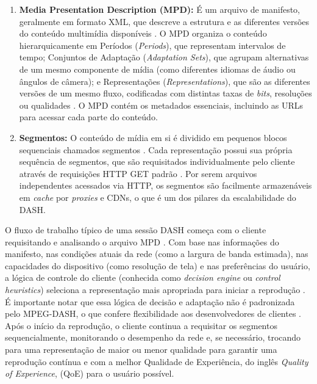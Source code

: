\begin{enumerate}
    \item \textbf{Media Presentation Description (MPD):} É um arquivo de manifesto, geralmente em formato XML, que descreve a estrutura e as diferentes versões do conteúdo multimídia disponíveis \cite{sodagar2011mpegdash}. O MPD organiza o conteúdo hierarquicamente em Períodos (\textit{Periods}), que representam intervalos de tempo; Conjuntos de Adaptação (\textit{Adaptation Sets}), que agrupam alternativas de um mesmo componente de mídia (como diferentes idiomas de áudio ou ângulos de câmera); e Representações (\textit{Representations}), que são as diferentes versões de um mesmo fluxo, codificadas com distintas taxas de \textit{bits}, resoluções ou qualidades \cite{sodagar2011mpegdash}. O MPD contém os metadados essenciais, incluindo as URLs para acessar cada parte do conteúdo.

    \item \textbf{Segmentos:} O conteúdo de mídia em si é dividido em pequenos blocos sequenciais chamados segmentos \cite{sodagar2011mpegdash}. Cada representação possui sua própria sequência de segmentos, que são requisitados individualmente pelo cliente através de requisições HTTP GET padrão \cite{stockhammer2011dynamic}. Por serem arquivos independentes acessados via HTTP, os segmentos são facilmente armazenáveis em \textit{cache} por \textit{proxies} e CDNs, o que é um dos pilares da escalabilidade do DASH.
\end{enumerate}

O fluxo de trabalho típico de uma sessão DASH começa com o cliente requisitando e analisando o arquivo MPD \cite{sodagar2011mpegdash}. Com base nas informações do manifesto, nas condições atuais da rede (como a largura de banda estimada), nas capacidades do dispositivo (como resolução de tela) e nas preferências do usuário, a lógica de controle do cliente (conhecida como \textit{decision engine} ou \textit{control heuristics}) seleciona a representação mais apropriada para iniciar a reprodução \cite{thang2012adaptive}. É importante notar que essa lógica de decisão e adaptação não é padronizada pelo MPEG-DASH, o que confere flexibilidade aos desenvolvedores de clientes \cite{sodagar2011mpegdash}. Após o início da reprodução, o cliente continua a requisitar os segmentos sequencialmente, monitorando o desempenho da rede e, se necessário, trocando para uma representação de maior ou menor qualidade para garantir uma reprodução contínua e com a melhor Qualidade de Experiência, do inglês \textit{Quality of Experience}, (QoE) para o usuário possível.

